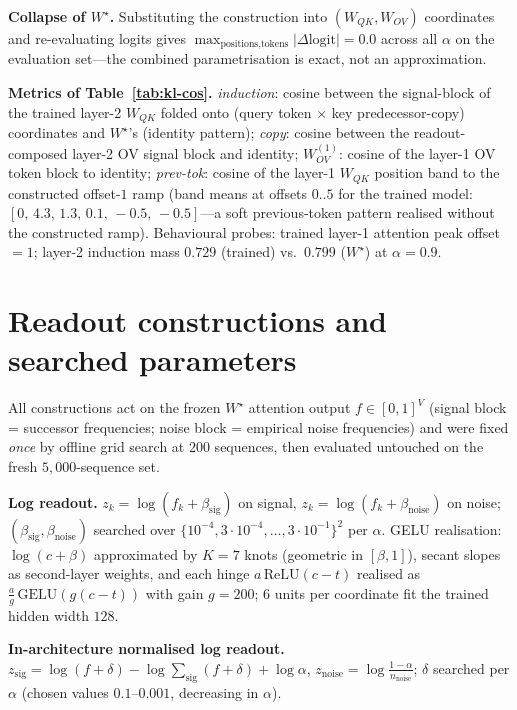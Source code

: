 \documentclass{article} %
\newcommand{\Wstar}{W^{\star}}
\newcommand{\nnoise}{n_{\mathrm{noise}}}
\newcommand{\WQK}{W_{QK}}
\newcommand{\WOV}{W_{OV}}
\begin{document}
\textbf{Collapse of $\Wstar$.} Substituting the construction into
$(\WQK,\WOV)$ coordinates and re-evaluating logits gives
$\max_{\text{positions,tokens}}|\Delta\text{logit}|=0.0$ across all $\alpha$ on the
evaluation set---the combined parametrisation is exact, not an approximation.

\textbf{Metrics of Table~\ref{tab:kl-cos}.} \emph{induction}: cosine between the
signal-block of the trained layer-2 $\WQK$ folded onto (query token
$\times$ key predecessor-copy) coordinates and $\Wstar$'s (identity pattern);
\emph{copy}: cosine between the readout-composed layer-2 OV signal block and
identity; \emph{$\WOV^{(1)}$}: cosine of the layer-1 OV token block to identity;
\emph{prev-tok}: cosine of the layer-1 $\WQK$ position band to the constructed
offset-$1$ ramp (band means at offsets $0..5$ for the trained model:
$[0,\,4.3,\,1.3,\,0.1,\,-0.5,\,-0.5]$---a soft previous-token pattern realised
without the constructed ramp). Behavioural probes: trained layer-1 attention peak
offset $=1$; layer-2 induction mass $0.729$ (trained) vs.\ $0.799$ ($\Wstar$) at
$\alpha=0.9$.

\section{Readout constructions and searched parameters}
\label{app:constructions}

All constructions act on the frozen $\Wstar$ attention output $f\in[0,1]^{V}$
(signal block = successor frequencies; noise block = empirical noise frequencies)
and were fixed \emph{once} by offline grid search at $200$ sequences, then evaluated
untouched on the fresh $5{,}000$-sequence set.

\textbf{Log readout.} $z_k=\log(f_k+\beta_{\mathrm{sig}})$ on signal,
$z_k=\log(f_k+\beta_{\mathrm{noise}})$ on noise;
$(\beta_{\mathrm{sig}},\beta_{\mathrm{noise}})$ searched over
$\{10^{-4},3\!\cdot\!10^{-4},\dots,3\!\cdot\!10^{-1}\}^2$ per $\alpha$. GELU
realisation: $\log(c+\beta)$ approximated by $K{=}7$ knots
(geometric in $[\beta,1]$), secant slopes as second-layer weights, and each hinge
$a\,\mathrm{ReLU}(c-t)$ realised as $\tfrac{a}{g}\,\mathrm{GELU}(g(c-t))$ with gain
$g=200$; $6$ units per coordinate fit the trained hidden width $128$.

\textbf{In-architecture normalised log readout.}
$z_{\mathrm{sig}}=\log(f+\delta)-\log\sum_{\mathrm{sig}}(f+\delta)+\log\alpha$,
$z_{\mathrm{noise}}=\log\frac{1-\alpha}{\nnoise}$; $\delta$ searched per $\alpha$
(chosen values $0.1$--$0.001$, decreasing in $\alpha$).
\end{document}
